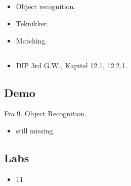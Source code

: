 \subsection{\subtopics}

\begin{itemize}
	\item Object recognition.
	\item Teknikker.
	\item Matching.
\end{itemize}

\subsection{\curriculum}

\begin{itemize}
	\item DIP 3rd G.W., Kapitel 12.1, 12.2.1.
\end{itemize}

\subsection{Demo}

Fra 9. Object Recognition.

\begin{itemize}
	\item still missing.
\end{itemize}

\subsection{Labs}

\begin{itemize}
	\item 11
\end{itemize}